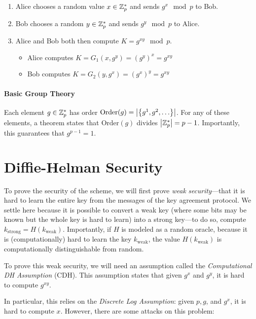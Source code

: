 \begin{enumerate}[noitemsep]
	\item Alice chooses a random value $x \in \mathbb{Z}_p^*$ and sends $g^x \mod p$ to Bob.
	\item Bob chooses a random $y \in \mathbb{Z}_p^*$ and sends $g^y \mod p$ to Alice.
	\item Alice and Bob both then compute $K = g^{xy} \mod p$.
		\begin{itemize}
			\item Alice computes $K = G_1(x, g^y) = (g^y)^x = g^{xy}$
			\item Bob computes $K = G_2(y, g^x) = (g^x)^y = g^{xy}$
		\end{itemize}
\end{enumerate}


\paragraph{Basic Group Theory}
Each element $g \in \mathbb{Z}_p^*$ has order $\text{Order}(g) = \left| \left\{ g^1, g^2, \ldots  \right\} \right|$. For any of these elements, a theorem states that $\text{Order}(g)$ divides $\left| \mathbb{Z}_p^* \right| = p-1$. Importantly, this guarantees that $g^{p-1} = 1$.

\section{Diffie-Helman Security}
To prove the security of the scheme, we will first prove \emph{weak security}---that it is hard to learn the entire key from the messages of the key agreement protocol. We settle here because it is possible to convert a weak key (where some bits may be known but the whole key is hard to learn) into a strong key---to do so, compute $k_\text{strong} = H(k_\text{weak})$. Importantly, if $H$ is modeled as a random oracle, because it is (computationally) hard to learn the key $k_\text{weak}$, the value $H(k_\text{weak})$ is computationally distinguishable from random.

To prove this weak security, we will need an assumption called the \emph{Computational DH Assumption} (CDH). This assumption states that given $g^x$ and $g^y$, it is hard to compute $g^{xy}$.

In particular, this relies on the \emph{Discrete Log Assumption}: given $p, g$, and $g^x$, it is hard to compute $x$. However, there are some attacks on this problem:

